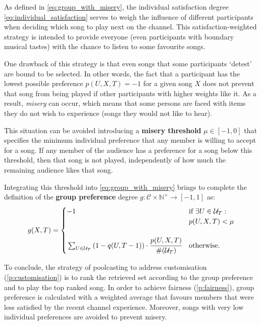 As defined in \eqref{eq:group_with_misery}, the individual satisfaction degree \eqref{eq:individual_satisfaction} serves to weigh the influence of different participants when deciding which song to play next on the channel.
%
This satisfaction-weighted strategy is intended to provide everyone (even participants with boundary musical tastes) with the chance to listen to some favourite songs.

One drawback of this strategy is that even songs that some participants `detest' are bound to be selected. 
In other words, the fact that a participant has the lowest possible preference $p(U,X,T) = -1$ for a given song $X$ does not prevent that song from being played if other participants with higher weights like it.
%
As a result, \emph{misery} can occur, which means that some persons are faced with items they do not wish to experience (songs they would not like to hear).

This situation can be avoided introducing a \textbf{misery threshold} $\mu \in [-1,0]$ that specifies the minimum individual preference that any member is willing to accept for a song.
If any member of the audience has a preference for a song below this threshold, then that song is not played, independently of how much the remaining audience likes that song.

Integrating this threshold into \eqref{eq:group_with_misery} brings to complete the definition of the \textbf{group preference} degree $g: \mathcal{C} \times \mathbb{N}^+ \to [-1,1]$ as:
\begin{equation*}%
  g(X,T) =      
\begin{cases}
-1 & \text{if $\exists U \in \mathcal{U}_T :$}\\
& \text{$p(U,X,T) < \mu$}\\        
\rule[-1em]{0pt}{4em} 
\sum_{U \in \mathcal{U}_T}\left( 1-q(U,T-1) \right) \cdot \cfrac{p(U,X,T)}{\#(\mathcal{U}_T)} & \text{otherwise.}
\end{cases}
\end{equation*}

To conclude, the strategy of poolcasting to address customisation (\ref{p:customisation}) is to rank the retrieved set according to the group preference and to play the top ranked song.
In order to achieve fairness (\ref{p:fairness}), group preference is calculated with a weighted average that favours members that were less satisfied by the recent channel experience.
Moreover, songs with very low individual preferences are avoided to prevent misery. 

